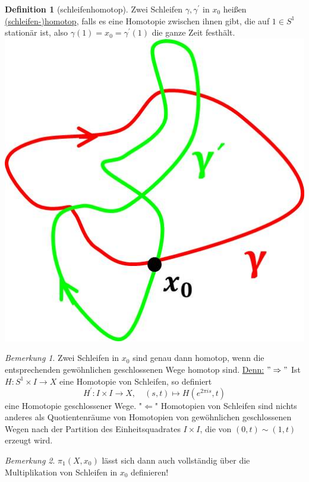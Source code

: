 \documentclass[a4paper,11pt,notitlepage]{report}
\theoremstyle{remark}
\newtheorem{remark}{Bemerkung}[chapter]
\theoremstyle{definition}
\newtheorem{definition}{Definition}[chapter]
\begin{document}
\begin{definition}[schleifenhomotop]
	Zwei Schleifen $\gamma, \gamma^\prime$ in $x_0$ heißen \underline{(schleifen-)homotop}, falls es eine Homotopie zwischen ihnen gibt, die auf $1 \in S^1$ stationär ist, also
	$\gamma(1) = x_0 = \gamma^\prime(1)$ die ganze Zeit festhält.
	 \newline \includegraphics[scale=0.3]{images/schleifenhomotop.jpg}
\end{definition}

\begin{remark}{}
	Zwei Schleifen in $x_0$ sind genau dann homotop, wenn die entsprechenden gewöhnlichen geschlossenen Wege homotop sind.
	\newline
	\underline{Denn:} $"\Rightarrow"$ Ist $H \colon S^1 \times I \rightarrow X$ eine Homotopie von Schleifen, so definiert 
	$$H^\prime \colon I \times I \rightarrow X,\quad (s,t) \mapsto H(e^{2 \pi i s}, t)$$
	eine Homotopie geschlossener Wege.
	\newline
	"$\Leftarrow$" Homotopien von Schleifen sind nichts anderes als Quotientenräume von Homotopien von gewöhnlichen geschlossenen Wegen nach der Partition des Einheitsquadrates $I \times I$, die von $(0,t) \sim (1,t)$ erzeugt wird.
\end{remark}

\begin{remark}{}
	$\pi_1(X,x_0)$ lässt sich dann auch vollständig über die Multiplikation von Schleifen in $x_0$ definieren!
\end{remark}
\end{document}
